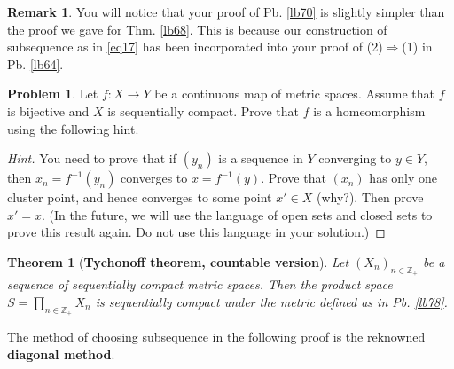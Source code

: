 \documentclass[12pt,b5paper,notitlepage]{article}
\theoremstyle{definition}
\newtheorem{rem}[df]{Remark}
\newtheorem{prob}{\color{red}Problem}[section]
\theoremstyle{plain}
\newtheorem{thm}[df]{Theorem}
\newcommand{\Zbb}{\mathbb Z}
\newcommand{\dps}{\displaystyle}
\numberwithin{equation}{section}
\begin{document}
\begin{rem}
You will notice that your proof of Pb. \ref{lb70} is slightly simpler than the proof we gave for Thm. \ref{lb68}. This is because our construction of subsequence as in \eqref{eq17} has been incorporated into your proof of (2)$\Rightarrow$(1) in Pb. \ref{lb64}.
\end{rem}

\begin{prob}\label{lb235}
Let $f:X\rightarrow Y$ be a continuous map of metric spaces. Assume that $f$ is bijective and $X$ is sequentially compact.  Prove that $f$ is a homeomorphism using the following hint.
\end{prob}

\begin{proof}[Hint]
You need to prove that if $(y_n)$ is a sequence in $Y$ converging to $y\in Y$, then $x_n=f^{-1}(y_n)$ converges to $x=f^{-1}(y)$. Prove that $(x_n)$ has only one cluster point, and hence converges to some point $x'\in X$ (why?). Then prove $x'=x$. (In the future, we will use the language of open sets and closed sets to prove this result again. Do not use this language in your solution.)
\end{proof}




\begin{thm}[\textbf{Tychonoff theorem, countable version}]  \label{lb89}
Let $(X_n)_{n\in\Zbb_+}$ be a sequence of sequentially compact metric spaces. Then the product space $\dps S=\prod_{n\in\Zbb_+} X_n$ is sequentially compact under the metric defined  as in Pb. \ref{lb78}.
\end{thm}

The method of choosing subsequence in the following proof is the reknowned \textbf{diagonal method}. 
\end{document}
